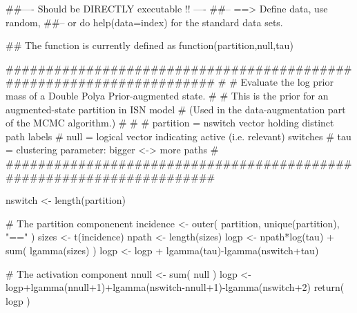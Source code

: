 \begin{Examples}
\begin{ExampleCode}
##---- Should be DIRECTLY executable !! ----
##-- ==>  Define data, use random,
##--         or do  help(data=index)  for the standard data sets.

## The function is currently defined as
function(partition,null,tau)
 {
  #####################################################################
  #
  # Evaluate the log prior mass of a Double Polya Prior-augmented state.
  #
  # This is the prior for an augmented-state partition in ISN model
  # (Used in the data-augmentation part of the MCMC algorithm.)
  #
  #
  # partition = nswitch vector holding distinct path labels
  # null = logical vector indicating active (i.e. relevant) switches
  # tau = clustering parameter: bigger <-> more paths
  #
  #####################################################################

  nswitch <- length(partition)

  # The partition componenent
  incidence <- outer( partition, unique(partition), "==" )
  sizes <- t(incidence) 
  npath <- length(sizes)
  logp <-  npath*log(tau) + sum( lgamma(sizes) ) 
  logp <- logp + lgamma(tau)-lgamma(nswitch+tau)

  # The activation component
  nnull <- sum( null )
  logp <- logp+lgamma(nnull+1)+lgamma(nswitch-nnull+1)-lgamma(nswitch+2)
  return( logp )
 }
\end{ExampleCode}
\end{Examples}

